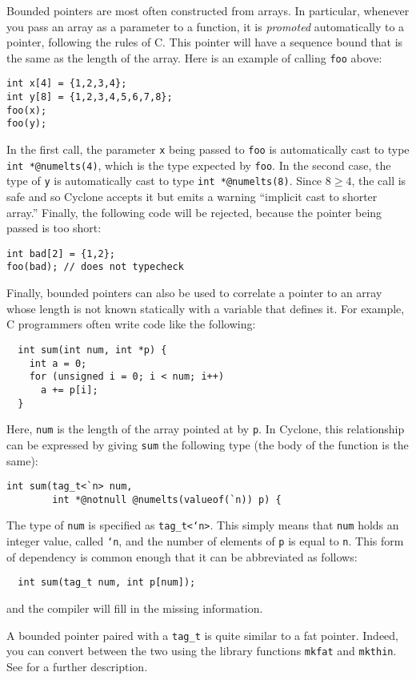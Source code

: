 Bounded pointers are most often constructed from arrays.  In
particular, whenever you pass an array as a parameter to a function,
it is \emph{promoted} automatically to a pointer, following the rules
of C.  This pointer will have a sequence bound that is the same as the
length of the array.  Here is an example of calling \texttt{foo} above:
\begin{verbatim}
int x[4] = {1,2,3,4};
int y[8] = {1,2,3,4,5,6,7,8};
foo(x);
foo(y);
\end{verbatim}
In the first call, the parameter \texttt{x} being passed to
\texttt{foo} is automatically cast to type \texttt{int *@numelts(4)},
which is the type expected by \texttt{foo}.  In the second case, the
type of \texttt{y} is automatically cast to type \texttt{int
*@numelts(8)}.  Since $8 \geq 4$, the call is safe and so Cyclone
accepts it but emits a warning ``implicit cast to shorter array.''
Finally, the following code will be rejected, because the pointer
being passed is too short:
\begin{verbatim}
int bad[2] = {1,2};
foo(bad); // does not typecheck
\end{verbatim}

Finally, bounded pointers can also be used to correlate a pointer to
an array whose length is not known statically with a variable that
defines it.  For example, C programmers often write code like the
following:
\begin{verbatim}
  int sum(int num, int *p) {
    int a = 0;
    for (unsigned i = 0; i < num; i++) 
      a += p[i];
  }
\end{verbatim}
Here, \texttt{num} is the length of the array pointed at by
\texttt{p}.  In Cyclone, this relationship can be expressed by giving
\texttt{sum} the following type (the body of the function is the
same):
\begin{verbatim}
int sum(tag_t<`n> num, 
        int *@notnull @numelts(valueof(`n)) p) {
\end{verbatim}
The type of \texttt{num} is specified as \texttt{tag_t<`n>}.  This
simply means that \texttt{num} holds an integer value, called \texttt{`n},
and the number of elements of \texttt{p} is equal to \texttt{n}.  
This form of dependency is common enough that it can be abbreviated
as follows:
\begin{verbatim}
  int sum(tag_t num, int p[num]);
\end{verbatim}
and the compiler will fill in the missing information.

A bounded pointer paired with a \texttt{tag_t} is quite similar
to a fat pointer.  Indeed, you can convert between the two using the
library functions \texttt{mkfat} and \texttt{mkthin}.  See
 for a further description.

